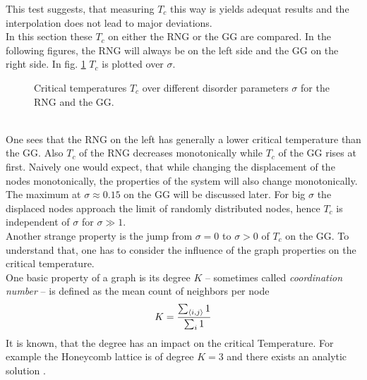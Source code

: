     This test suggests, that measuring \(T_c\) this way is yields
    adequat results and the interpolation does not lead to major
    deviations.\\
    In this section these \(T_c\) on either the RNG or the GG are
    compared. In the following figures, the RNG will always be on the
    left side and the GG on the right side.
    In fig. \ref{fig:Tc} \(T_c\) is plotted over \(\sigma\).
    \begin{figure}[htbp]
        \centering
        \caption[Critical Temperature over different disorder parameters]
        {
            Critical temperatures \(T_c\) over different
            disorder parameters \(\sigma\) for
             the RNG and
             the GG.\\
        }
        \label{fig:Tc}
    \end{figure}\\
    One sees that the RNG on the left has generally a lower critical
    temperature than the GG. Also \(T_c\) of the RNG decreases
    monotonically while \(T_c\) of the GG rises at first. Naively one would
    expect, that while changing the displacement of the nodes monotonically,
    the properties of the system will also change monotonically. The
    maximum at \(\sigma \approx 0.15\) on the GG will be discussed later.
    For big \(\sigma\) the displaced nodes approach the limit of randomly
    distributed nodes, hence \(T_c\) is independent of \(\sigma\) for
    \(\sigma \gg 1\).\\
    Another strange property is the jump from \(\sigma = 0\) to \(\sigma > 0\)
    of \(T_c\) on the GG. To understand that, one has to
    consider the influence of the graph properties on the critical
    temperature.\\
    One basic property of a graph is its degree \(K\) -- sometimes
    called \emph{coordination number} -- is defined as the mean count of
    neighbors per node
    \begin{equation}
        K = \frac{\sum_{\left< i,j \right>} 1}{\sum_{i} 1}
        \label{eq:degree}
    \end{equation}
    It is known, that the degree has an impact on the critical Temperature.
    For example the Honeycomb lattice is of degree \(K=3\)
    and there exists an analytic solution \cite{Wannier1945}.
